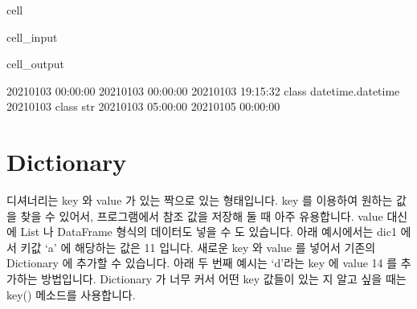 \documentclass[letterpaper,10pt,english]{jupyterBook}
\begin{document}
\begin{sphinxuseclass}{cell}
\begin{sphinxVerbatimInput}
\begin{sphinxuseclass}{cell_input}
\end{sphinxuseclass}\end{sphinxVerbatimInput}
\begin{sphinxVerbatimOutput}

\begin{sphinxuseclass}{cell_output}
\begin{sphinxVerbatim}[commandchars=\\\{\}]
2021\PYGZhy{}01\PYGZhy{}03 00:00:00
2021\PYGZhy{}01\PYGZhy{}03 00:00:00
2021\PYGZhy{}01\PYGZhy{}03 19:15:32 \PYGZlt{}class \PYGZsq{}datetime.datetime\PYGZsq{}\PYGZgt{}
2021\PYGZhy{}01\PYGZhy{}03 \PYGZlt{}class \PYGZsq{}str\PYGZsq{}\PYGZgt{}
2021\PYGZhy{}01\PYGZhy{}03 05:00:00
2021\PYGZhy{}01\PYGZhy{}05 00:00:00
\end{sphinxVerbatim}

\end{sphinxuseclass}\end{sphinxVerbatimOutput}

\end{sphinxuseclass}

\section{Dictionary}
\label{\detokenize{chapter2/2.1.1_Python_Basics:dictionary}}
\sphinxAtStartPar
디셔너리는 key 와 value 가 있는 짝으로 있는 형태입니다. key 를 이용하여 원하는 값을 찾을 수 있어서, 프로그램에서 참조 값을 저장해 둘 때 아주 유용합니다. value 대신에 List 나 DataFrame 형식의 데이터도 넣을 수 도 있습니다. 아래 예시에서는 dic1 에서 키값 ‘a’ 에 해당하는 값은 11 입니다. 새로운 key 와 value 를 넣어서 기존의 Dictionary 에 추가할 수 있습니다. 아래 두 번째 예시는 ‘d’라는 key 에 value 14 를 추가하는 방법입니다. Dictionary 가 너무 커서 어떤 key 값들이 있는 지 알고 싶을 때는 key() 메소드를 사용합니다.
\end{document}
